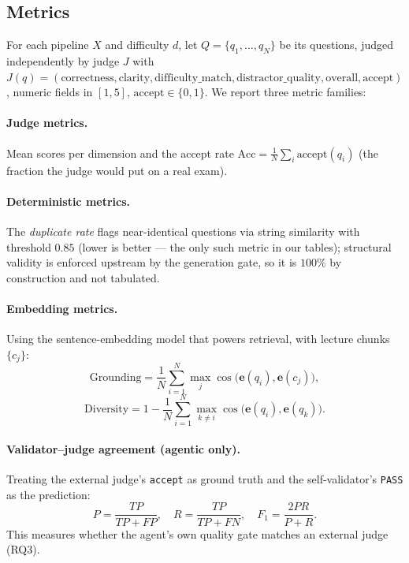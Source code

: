 \subsection{Metrics}
\label{sec:eval-metrics}

For each pipeline $X$ and difficulty $d$, let $Q=\{q_1,\dots,q_N\}$ be its
questions, judged independently by judge $J$ with
$J(q)=(\text{correctness},\text{clarity},\text{difficulty\_match},
\text{distractor\_quality},\text{overall},\text{accept})$, numeric fields in
$[1,5]$, $\text{accept}\in\{0,1\}$. We report three metric families:

\paragraph{Judge metrics.} Mean scores per dimension and the accept rate
$\mathrm{Acc}=\frac{1}{N}\sum_i \text{accept}(q_i)$ (the fraction the judge
would put on a real exam).

\paragraph{Deterministic metrics.} The \emph{duplicate rate} flags
near-identical questions via string similarity with threshold $0.85$ (lower is
better --- the only such metric in our tables); structural validity is
enforced upstream by the generation gate, so it is $100\%$ by construction and
not tabulated.

\paragraph{Embedding metrics.} Using the sentence-embedding model that powers
retrieval, with lecture chunks $\{c_j\}$:
\begin{equation}
  \mathrm{Grounding} = \frac{1}{N}\sum_{i=1}^{N}\max_{j}\cos\!\big(\mathbf{e}(q_i),\mathbf{e}(c_j)\big),
\end{equation}
\begin{equation}
  \mathrm{Diversity} = 1 - \frac{1}{N}\sum_{i=1}^{N}\max_{k\neq i}\cos\!\big(\mathbf{e}(q_i),\mathbf{e}(q_k)\big).
\end{equation}

\paragraph{Validator--judge agreement (agentic only).} Treating the external
judge's \texttt{accept} as ground truth and the self-validator's \texttt{PASS}
as the prediction:
\begin{equation}
  P = \frac{TP}{TP+FP}, \quad
  R = \frac{TP}{TP+FN}, \quad
  F_1 = \frac{2PR}{P+R}.
\end{equation}
This measures whether the agent's own quality gate matches an external judge
(RQ3).

